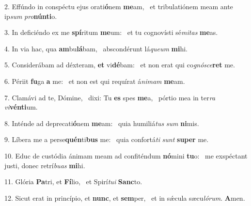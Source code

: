 2. Effúndo in conspéctu ejus orati\textbf{ó}nem \textbf{me}am, \ast\  et tribulatiónem meam ante ip\textit{sum} \textit{pro}\textbf{nún}\textbf{ti}o.\

3. In deficiéndo ex me \textbf{spí}ritum \textbf{me}um: \ast\  et tu cognovísti sé\textit{mi}\textit{tas} \textbf{me}as.\

4. In via hac, qua \textbf{am}bu\textbf{lá}bam, \ast\  abscondérunt lá\textit{que}\textit{um} \textbf{mi}hi.\

5. Considerábam ad déxteram, \textbf{et} vi\textbf{dé}bam: \ast\  et non erat qui co\textit{gnó}\textit{sce}\textbf{ret} me.\

6. Périit \textbf{fu}ga \textbf{a} me: \ast\  et non est qui requírat á\textit{ni}\textit{mam} \textbf{me}am.\

7. Clamávi ad te, Dómine, \dag\  dixi: Tu \textbf{es} spes \textbf{me}a, \ast\  pórtio mea in ter\textit{ra} \textit{vi}\textbf{vén}\textbf{ti}um.\

8. Inténde ad deprecati\textbf{ó}nem \textbf{me}am: \ast\  quia humiliá\textit{tus} \textit{sum} \textbf{ni}mis.\

9. Líbera me a perse\textbf{quén}ti\textbf{bus} me: \ast\  quia confortá\textit{ti} \textit{sunt} \textbf{su}\textbf{per} me.\

10. Educ de custódia ánimam meam ad confiténdum \textbf{nó}mini \textbf{tu}o: \ast\  me exspéctant justi, donec retrí\textit{bu}\textit{as} \textbf{mi}hi.\

11. Glória \textbf{Pa}tri, et \textbf{Fí}lio, \ast\  et Spirí\textit{tu}\textit{i} \textbf{Sanc}to.\

12. Sicut erat in princípio, et \textbf{nunc}, et \textbf{sem}per, \ast\  et in sǽcula sæcu\textit{ló}\textit{rum}. \textbf{A}men.\

